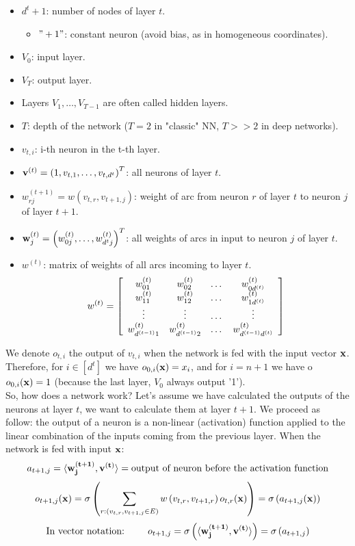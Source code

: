 \documentclass[12pt]{report}
\theoremstyle{plain}
\newcommand\sprod[2]{\langle \vb{#1},\vb{#2}\rangle}
\begin{document}
\begin{flushleft}
\begin{itemize}
	\item $d^t+1$: number of nodes of layer $t$.
	\begin{itemize}
		\item $"+1"$: constant neuron (avoid bias, as in homogeneous coordinates).
	\end{itemize}
	\item $V_0$: input layer.
	\item $V_T$: output layer.
	\item Layers $V_1,\dots,V_{T-1}$ are often called hidden layers.
	\item $T$: depth of the network ($T=2$ in "classic" NN, $T>>2$ in deep networks).
	\item $v_{t,i}$: i-th neuron in the t-th layer.
	\item $\vb{v}^{(t)}=\left(1,v_{t,1},\dots,v_{t,d^t}\right)^T$: all neurons of layer $t$.
	\item $w_{rj}^{(t+1)}=w\left(v_{t,r},v_{t+1,j}\right)$: weight of arc from neuron $r$ of layer $t$ to neuron $j$ of layer $t+1$.
	\item $\vb{w}_j^{(t)}=\left(w_{0j}^{(t)},\dots,w_{d^tj}^{(t)}\right)^T$: all weights of arcs in input to neuron $j$ of layer $t$.
	\item $w^{(t)}$: matrix of weights of all arcs incoming to layer $t$.
	\[ w^{(t)}=\left[\begin{array}{c c c c} w_{01}^{(t)} &w_{02}^{(t)} &\dots &w_{0d^{(t)}}^{(t)}\\ w_{11}^{(t)} &w_{12}^{(t)} &\dots &w_{1d^{(t)}}^{(t)}\\
	\vdots &\vdots &\dots &\vdots\\ w_{d^{(t-1)}1}^{(t)} &w_{d^{(t-1)}2}^{(t)} &\dots &w_{d^{(t-1)}d^{(t)}}^{(t)} \end{array}\right] \] 
\end{itemize}
We denote  $o_{t,i}$ the output of $v_{t,i}$ when the network is fed with the input vector $\vb{x}$. Therefore, for $i\in[d^t]$ we have $o_{0,i}(\vb{x}) = x_i$, and for $i = n + 1$ we have o $o_{0,i}(\vb{x}) = 1$ (because the last layer, $V_0$ always output '1').\\
So, how does a network work? Let's assume we have calculated the outputs of the neurons at layer $t$, we want to calculate them at layer $t+1$. We proceed as follow: the output of a neuron is a non-linear (activation) function applied to the linear combination of the inputs coming from the previous layer. When the network is fed with input $\vb{x}$:
\[ a_{t+1,j}=\sprod{w_j^{(t+1)}}{v^{(t)}} = \text{output of neuron before the activation function} \]
\[ o_{t+1,j}(\vb{x})=\sigma\left(\sum_{r:\left(v_{t,r},v_{t+1,j}\in E\right)} w\left(v_{t,r},v_{t+1,r}\right)o_{t,r}(\vb{x})\right)=\sigma\left(a_{t+1,j}(\vb{x})\right) \]
\[ \text{In vector notation: } \qquad o_{t+1,j}=\sigma\left(\sprod{w_j^{(t+1)}}{v^{(t)}}\right)=\sigma\left(a_{t+1,j}\right) \]

\end{flushleft}
\end{document}
